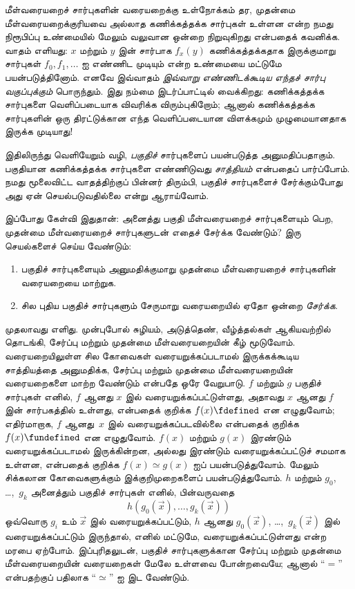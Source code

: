 \documentclass[../../../include/open-logic-section]{subfiles}
\begin{document}



மீள்வரையறைச் சார்புகளின் வரையறைக்கு உள்நோக்கம் தர, முதன்மை
மீள்வரையறைக்குரியவை அல்லாத கணிக்கத்தக்க சார்புகள் உள்ளன என்ற நமது
நிரூபிப்பு உண்மையில் மேலும் வலுவான ஒன்றை நிறுவுகிறது என்பதைக் கவனிக்க.
வாதம் எளியது: $x$ மற்றும் $y$ இன் சார்பாக $f_x(y)$ கணிக்கத்தக்கதாக
இருக்குமாறு சார்புகள் $f_0,f_1,\dots$ ஐ எண்ணிட முடியும் என்ற உண்மையை
மட்டுமே பயன்படுத்தினோம். எனவே இவ்வாதம்
\emph{இவ்வாறு எண்ணிடக்கூடிய எந்தச் சார்பு வகுப்புக்கும்} பொருந்தும்.
இது நம்மை இடர்ப்பாட்டில் வைக்கிறது: கணிக்கத்தக்க சார்புகளை
வெளிப்படையாக விவரிக்க விரும்புகிறோம்; ஆனால் கணிக்கத்தக்க சார்புகளின்
ஒரு திரட்டுக்கான எந்த வெளிப்படையான விளக்கமும் முழுமையானதாக இருக்க
முடியாது!

இதிலிருந்து வெளியேறும் வழி, \emph{பகுதிச்} சார்புகளைப் பயன்படுத்த
அனுமதிப்பதாகும். பகுதியான கணிக்கத்தக்க சார்புகளை எண்ணிடுவது
\emph{சாத்தியம்} என்பதைப் பார்ப்போம். நமது மூலைவிட்ட வாதத்திற்குப்
பின்னர் திரும்பி, பகுதிச் சார்புகளைச் சேர்க்கும்போது அது ஏன்
செயல்படுவதில்லை என்று ஆராய்வோம்.

இப்போது கேள்வி இதுதான்: அனைத்து பகுதி மீள்வரையறைச் சார்புகளையும்
பெற, முதன்மை மீள்வரையறைச் சார்புகளுடன் எதைச் சேர்க்க வேண்டும்?
இரு செயல்களைச் செய்ய வேண்டும்:
\begin{enumerate}
\item பகுதிச் சார்புகளையும் அனுமதிக்குமாறு முதன்மை மீள்வரையறைச்
  சார்புகளின் வரையறையை மாற்றுக.
\item சில புதிய பகுதிச் சார்புகளும் சேருமாறு வரையறையில் ஏதோ ஒன்றை
  \emph{சேர்க்க}.
\end{enumerate}

முதலாவது எளிது. முன்புபோல் சுழியம், அடுத்தெண், வீழ்த்தல்கள்
ஆகியவற்றில் தொடங்கி, சேர்ப்பு மற்றும் முதன்மை மீள்வரையறையின் கீழ்
மூடுவோம். வரையறையிலுள்ள சில கோவைகள் வரையறுக்கப்படாமல் இருக்கக்கூடிய
சாத்தியத்தை அனுமதிக்க, சேர்ப்பு மற்றும் முதன்மை மீள்வரையறையின்
வரையறைகளை மாற்ற வேண்டும் என்பதே ஒரே வேறுபாடு. $f$ மற்றும் $g$
பகுதிச் சார்புகள் எனில், $f$ ஆனது $x$ இல் வரையறுக்கப்பட்டுள்ளது,
அதாவது $x$ ஆனது $f$ இன் சார்பகத்தில் உள்ளது, என்பதைக் குறிக்க
$f(x) \fdefined$ என எழுதுவோம்; எதிர்மாறாக, $f$ ஆனது~$x$ இல்
வரையறுக்கப்படவில்லை என்பதைக் குறிக்க $f(x) \fundefined$ என எழுதுவோம்.
$f(x)$ மற்றும் $g(x)$ இரண்டும் வரையறுக்கப்படாமல் இருக்கின்றன,
அல்லது இரண்டும் வரையறுக்கப்பட்டுச் சமமாக உள்ளன, என்பதைக் குறிக்க
$f(x) \simeq g(x)$ ஐப் பயன்படுத்துவோம். மேலும் சிக்கலான கோவைகளுக்கும்
இக்குறிமுறைகளைப் பயன்படுத்துவோம். $h$ மற்றும் $g_0$, \dots,~$g_k$
அனைத்தும் பகுதிச் சார்புகள் எனில், பின்வருவதை
\[
h(g_0(\vec x),\dots,g_k(\vec x))
\]
ஒவ்வொரு $g_i$ உம் $\vec x$ இல் வரையறுக்கப்பட்டும், $h$ ஆனது
$g_0(\vec x)$, \dots,~$g_k(\vec x)$ இல் வரையறுக்கப்பட்டும் இருந்தால்,
எனில் மட்டுமே, வரையறுக்கப்பட்டுள்ளது என்ற மரபை ஏற்போம். இப்புரிதலுடன்,
பகுதிச் சார்புகளுக்கான சேர்ப்பு மற்றும் முதன்மை மீள்வரையறையின்
வரையறைகள் மேலே உள்ளவை போன்றவையே; ஆனால் “$=$” என்பதற்குப் பதிலாக
“$\simeq$” ஐ இட வேண்டும்.
\end{document}
